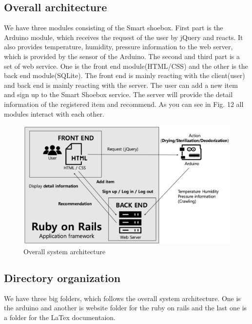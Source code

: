 \documentclass[conference]{IEEEtran}
\begin{document}
\subsection{Overall architecture} We have three modules consisting of the Smart shoebox. First part is the Arduino module, which receives the request of the user by jQuery and reacts. It also provides temperature, humidity, pressure information to the web server, which is provided by the sensor of the Arduino. The second and third part is a set of web service. One is the front end module(HTML/CSS) and the other is the back end module(SQLite). The front end is mainly reacting with the client(user) and back end is mainly reacting with the server. The user can add a new item and sign up to the Smart Shoebox service. The server will provide the detail information of the registered item and recommend. As you can see in Fig. 12 all modules interact with each other. 
\begin{figure}[h]
\begin{center}
    \includegraphics[scale=0.32]{overallarchitecture}
   \caption{Overall system architecture}\label{fig:label}
\end{center}
\end{figure}
\subsection{Directory organization}
We have three big folders, which follows the overall system architecture. One is the arduino and another is website folder for the ruby on rails and the last one is a folder for the LaTex documentaion.
\end{document}
